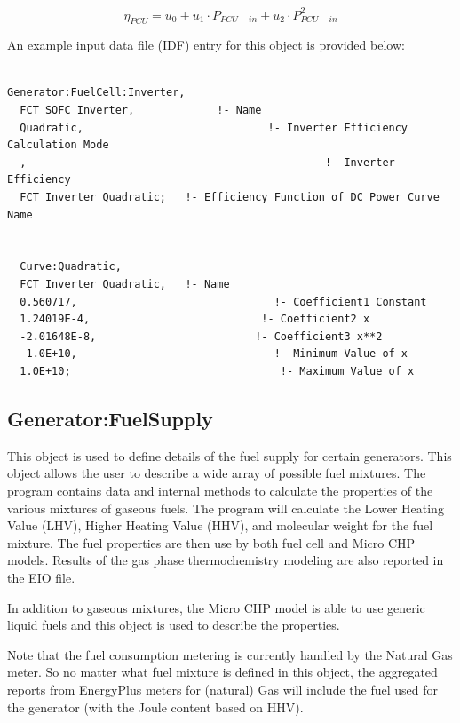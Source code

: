 \begin{equation}
{\eta_{PCU}} = {u_0} + {u_1} \cdot {P_{PCU - in}} + {u_2} \cdot P_{PCU - in}^2
\end{equation}

An example input data file (IDF) entry for this object is provided below:

\begin{lstlisting}

Generator:FuelCell:Inverter,
  FCT SOFC Inverter,             !- Name
  Quadratic,                             !- Inverter Efficiency Calculation Mode
  ,                                               !- Inverter Efficiency
  FCT Inverter Quadratic;   !- Efficiency Function of DC Power Curve Name


  Curve:Quadratic,
  FCT Inverter Quadratic,   !- Name
  0.560717,                               !- Coefficient1 Constant
  1.24019E-4,                           !- Coefficient2 x
  -2.01648E-8,                         !- Coefficient3 x**2
  -1.0E+10,                               !- Minimum Value of x
  1.0E+10;                                 !- Maximum Value of x
\end{lstlisting}

\subsection{Generator:FuelSupply}\label{generatorfuelsupply}

This object is used to define details of the fuel supply for certain generators. This object allows the user to describe a wide array of possible fuel mixtures. The program contains data and internal methods to calculate the properties of the various mixtures of gaseous fuels. The program will calculate the Lower Heating Value (LHV), Higher Heating Value (HHV), and molecular weight for the fuel mixture. The fuel properties are then use by both fuel cell and Micro CHP models. Results of the gas phase thermochemistry modeling are also reported in the EIO file.

In addition to gaseous mixtures, the Micro CHP model is able to use generic liquid fuels and this object is used to describe the properties.

Note that the fuel consumption metering is currently handled by the Natural Gas meter. So no matter what fuel mixture is defined in this object, the aggregated reports from EnergyPlus meters for (natural) Gas will include the fuel used for the generator (with the Joule content based on HHV).

